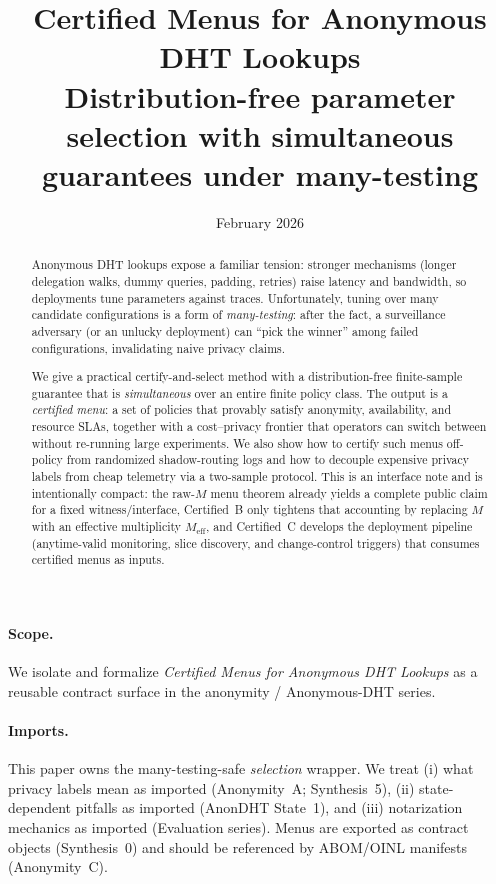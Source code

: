 \documentclass[11pt]{article}
\title{Certified Menus for Anonymous DHT Lookups\\
\large Distribution-free parameter selection with simultaneous guarantees under many-testing}
\author{}
\date{February 2026}
\begin{document}
\maketitle

\begin{abstract}
Anonymous DHT lookups expose a familiar tension: stronger mechanisms (longer delegation walks, dummy queries, padding, retries) raise latency and bandwidth, so deployments tune parameters against traces.
Unfortunately, tuning over many candidate configurations is a form of \emph{many-testing}: after the fact, a surveillance adversary (or an unlucky deployment) can ``pick the winner'' among failed configurations, invalidating naive privacy claims.

We give a practical certify-and-select method with a distribution-free finite-sample guarantee that is \emph{simultaneous} over an entire finite policy class.
The output is a \emph{certified menu}: a set of policies that provably satisfy anonymity, availability, and resource SLAs, together with a cost--privacy frontier that operators can switch between without re-running large experiments.
We also show how to certify such menus off-policy from randomized shadow-routing logs and how to decouple expensive privacy labels from cheap telemetry via a two-sample protocol.
This is an interface note and is intentionally compact: the raw-$M$ menu theorem already yields a complete public claim for a fixed witness/interface, Certified~B only tightens that accounting by replacing $M$ with an effective multiplicity $M_{\mathrm{eff}}$, and Certified~C develops the deployment pipeline (anytime-valid monitoring, slice discovery, and change-control triggers) that consumes certified menus as inputs.
\end{abstract}

\paragraph{Scope.}
We isolate and formalize \emph{Certified Menus for Anonymous DHT Lookups} as a reusable contract surface in the anonymity / Anonymous-DHT series.

\paragraph{Imports.}
This paper owns the many-testing-safe \emph{selection} wrapper.
We treat (i) what privacy labels mean as imported (Anonymity~A; Synthesis~5),\cite{series:oddsinflation,series:endpointbridge}
(ii) state-dependent pitfalls as imported (AnonDHT State~1),\cite{series:state1}
and (iii) notarization mechanics as imported (Evaluation series).
Menus are exported as contract objects (Synthesis~0) and should be referenced by ABOM/OINL manifests (Anonymity~C).\cite{series:contractobjects,series:abomoinl}
\end{document}
